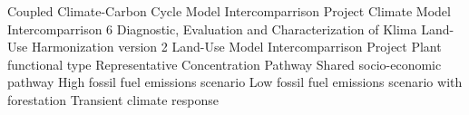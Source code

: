 \documentclass[draft]{agujournal2019}
\begin{document}

%
%
%
%

%


\begin{acronyms}
     Coupled Climate-Carbon Cycle Model Intercomparrison Project
     Climate Model Intercomparrison 6
     Diagnostic, Evaluation and Characterization of Klima
     Land-Use Harmonization version 2
     Land-Use Model Intercomparrison Project
     Plant functional type
     Representative Concentration Pathway
     Shared socio-economic pathway
     High fossil fuel emissions scenario
     Low fossil fuel emissions scenario with forestation
     Transient climate response
\end{acronyms}


\end{document}
